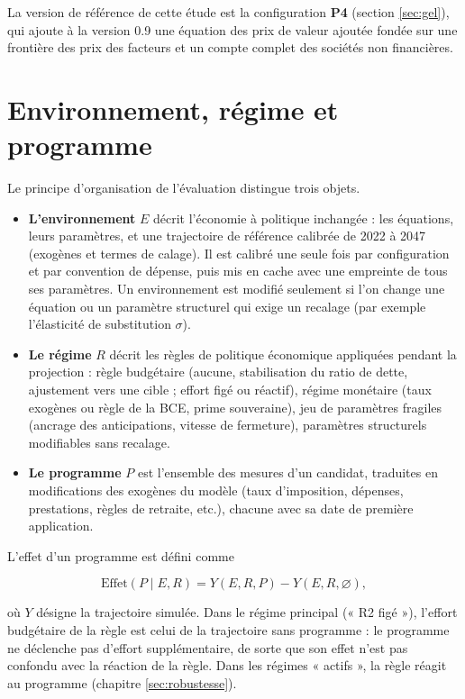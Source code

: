 \documentclass[
  11pt,
  11pt,
  a4paper,
  openany]{book}
\providecommand{\tightlist}{%
  \setlength{\itemsep}{0pt}\setlength{\parskip}{0pt}}
\begin{document}
La version de référence de cette étude est la configuration \textbf{P4}
(section \ref{sec:gel}), qui ajoute à la version 0.9 une équation des
prix de valeur ajoutée fondée sur une frontière des prix des facteurs et
un compte complet des sociétés non financières.

\hypertarget{sec:env-regime-prog}{%
\section{Environnement, régime et programme}\label{sec:env-regime-prog}}

Le principe d'organisation de l'évaluation distingue trois objets.

\begin{itemize}
\tightlist
\item
  \textbf{L'environnement} \(E\) décrit l'économie à politique inchangée
  : les équations, leurs paramètres, et une trajectoire de référence
  calibrée de 2022 à 2047 (exogènes et termes de calage). Il est calibré
  une seule fois par configuration et par convention de dépense, puis
  mis en cache avec une empreinte de tous ses paramètres. Un
  environnement est modifié seulement si l'on change une équation ou un
  paramètre structurel qui exige un recalage (par exemple l'élasticité
  de substitution \(\sigma\)).
\item
  \textbf{Le régime} \(R\) décrit les règles de politique économique
  appliquées pendant la projection : règle budgétaire (aucune,
  stabilisation du ratio de dette, ajustement vers une cible ; effort
  figé ou réactif), régime monétaire (taux exogènes ou règle de la BCE,
  prime souveraine), jeu de paramètres fragiles (ancrage des
  anticipations, vitesse de fermeture), paramètres structurels
  modifiables sans recalage.
\item
  \textbf{Le programme} \(P\) est l'ensemble des mesures d'un candidat,
  traduites en modifications des exogènes du modèle (taux d'imposition,
  dépenses, prestations, règles de retraite, etc.), chacune avec sa date
  de première application.
\end{itemize}

L'effet d'un programme est défini comme

\[\text{Effet}(P \mid E, R) = Y(E, R, P) - Y(E, R, \varnothing),\]

où \(Y\) désigne la trajectoire simulée. Dans le régime principal (« R2
figé »), l'effort budgétaire de la règle est celui de la trajectoire
sans programme : le programme ne déclenche pas d'effort supplémentaire,
de sorte que son effet n'est pas confondu avec la réaction de la règle.
Dans les régimes « actifs », la règle réagit au programme (chapitre
\ref{sec:robustesse}).
\end{document}
